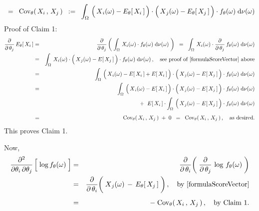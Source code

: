 \begin{enumerate}
\begin{equation*}
	\;\; = \;\;
		\Cov_{\theta}\!\left(\,X_{i}\,,\,X_{j}\,\right)
	\;\; := \;\;
		\int_{\Omega}\,
			\left(\,\overset{{\color{white}.}}{X}_{i}(\omega) - E_{\theta}\!\left[\,X_{i}\,\right]\,\right)
			\cdot
			\left(\,\overset{{\color{white}.}}{X}_{j}(\omega) - E_{\theta}\!\left[\,X_{j}\,\right]\,\right)
			\cdot
			f_{\theta}(\omega)
		\;\d\nu(\omega)
	\end{equation*}
	Proof of Claim 1:\quad
	\begin{eqnarray*}
	\dfrac{\partial}{\partial\,\theta_{j}}\,E_{\theta}\!\left[\,X_{i}\,\right]
	& = &
		\dfrac{\partial}{\partial\,\theta_{j}}
		\left(\;
			\int_{\Omega}\,
			X_{i}(\omega) \cdot f_{\theta}(\omega)
			\;\d\nu(\omega)
		\;\right)
	\;\; = \;\;
		\int_{\Omega}\,
			X_{i}(\omega) \cdot
			\dfrac{\partial}{\partial\,\theta_{j}}\,f_{\theta}(\omega)
		\;\d\nu(\omega)
	\\
	& = &
		\int_{\Omega}\,
			X_{i}(\omega) \cdot
			\left(\,\overset{{\color{white}.}}{X}_{j}(\omega) - E\!\left[\,X_{j}\,\right]\,\right)
			\cdot
			f_{\theta}(\omega)
		\;\d\nu(\omega)\,,
		\quad
		\textnormal{see proof of \eqref{formulaScoreVector} above}
	\\
	& = &
		\int_{\Omega}\,
			\left(\,\overset{{\color{white}.}}{X}_{i}(\omega) - E\!\left[\,X_{i}\,\right] + E\!\left[\,X_{i}\,\right]\,\right)
			\cdot
			\left(\,\overset{{\color{white}.}}{X}_{j}(\omega) - E\!\left[\,X_{j}\,\right]\,\right)
			\cdot
			f_{\theta}(\omega)
		\;\d\nu(\omega)
	\\
	& = &
		{\color{white}+}\;
		\int_{\Omega}\,
			\left(\,\overset{{\color{white}.}}{X}_{i}(\omega) - E\!\left[\,X_{i}\,\right]\,\right)
			\cdot
			\left(\,\overset{{\color{white}.}}{X}_{j}(\omega) - E\!\left[\,X_{j}\,\right]\,\right)
			\cdot
			f_{\theta}(\omega)
		\;\d\nu(\omega)
	\\
	&&
		+\;\;
		E\!\left[\,X_{i}\,\right]
		\cdot
		\int_{\Omega}\,
			\left(\,\overset{{\color{white}.}}{X}_{j}(\omega) - E\!\left[\,X_{j}\,\right]\,\right)
			\cdot
			f_{\theta}(\omega)
		\;\d\nu(\omega)
	\\
	& \overset{{\color{white}\vert}}{=} &
		\Cov_{\theta}\!\left(\,X_{i}\,,\,X_{j}\,\right) \; + \; 0
	\;\; = \;\;
		\Cov_{\theta}\!\left(\,X_{i}\,,\,X_{j}\,\right),
		\quad
		\textnormal{as desired}.
	\end{eqnarray*}
	This proves Claim 1.
	
	\vskip 0.5cm
	\noindent
	Now,
	\begin{eqnarray*}
	\dfrac{\partial^{2}}{\partial\theta_{i}\,\partial\theta_{j}} \left[\;\overset{{\color{white}.}}{\log} \, f_{\theta}(\omega)\;\right]
	&=&
		\dfrac{\partial}{\partial\,\theta_{i}}\!
		\left(\;
			\dfrac{\partial}{\partial\,\theta_{j}}\, \log \, f_{\theta}(\omega)
		\;\right)
	\\
	&=&
		\dfrac{\partial}{\partial\,\theta_{i}}\!
		\left(\;
			\overset{{\color{white}-}}{X}_{j}(\omega) \, - \, E_{\theta}\!\left[\,X_{j}\,\right]
		\;\right),
		\quad
		\textnormal{by \eqref{formulaScoreVector}}
	\\
	&\overset{{\color{white}\vert}}{=}&
		-\; \Cov_{\theta}\!\left(\,X_{i}\,,\,X_{j}\,\right),
		\quad
		\textnormal{by Claim 1}.
	\end{eqnarray*}
\end{enumerate}
